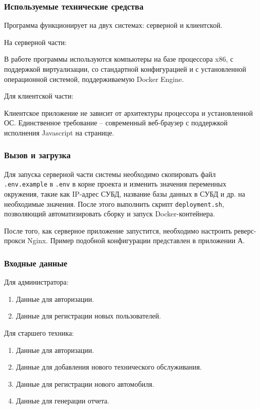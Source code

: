\documentclass[../nirs.tex]{subfiles}
\begin{document}
    \subsubsection*{Используемые технические средства}

    Программа функционирует на двух системах: серверной и клиентской.

    На серверной части:

    В работе программы используются компьютеры на базе процессора x86, с
    поддержкой виртуализации, со стандартной конфигурацией и с установленной
    операционной системой, поддерживаемую Docker Engine.

    Для клиентской части:

    Клиентское приложение не зависит от архитектуры процессора и установленной ОС.
    Единственное требование -- современный веб-браузер с поддержкой исполнения
    Javascript на странице.

    \subsubsection*{Вызов и загрузка}

    Для запуска серверной части системы необходимо скопировать файл
    \texttt{.env.example} в \texttt{.env} в корне проекта и изменить значения
    переменных окружения, такие как IP-адрес СУБД, название базы данных в СУБД
    и др. на необходимые значения. После этого выполнить скрипт
    \texttt{deployment.sh}, позволяющий автоматизировать сборку и запуск
    Docker-контейнера.

    После того, как серверное приложение запустится, необходимо настроить
    реверс-прокси Nginx. Пример подобной конфигурации представлен в приложении
    А.

    \subsubsection*{Входные данные}
    Для администратора:
    \begin{enumerate}
        \item Данные для авторизации.
        \item Данные для регистрации новых пользователей.
    \end{enumerate}

    Для старшего техника:
    \begin{enumerate}
        \item Данные для авторизации.
        \item Данные для добавления нового технического обслуживания.
        \item Данные для регистрации нового автомобиля.
        \item Данные для генерации отчета.
    \end{enumerate}
\end{document}
